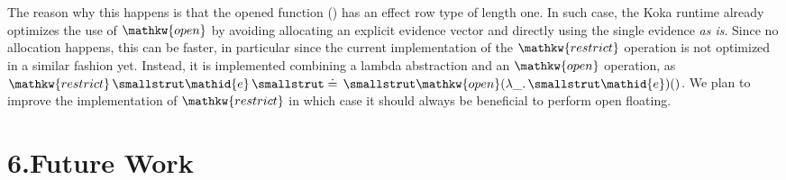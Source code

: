 \documentclass{llncs}
\begin{document}
The reason why this happens is that the 
opened function () has an effect row type of length one.
In such case, the Koka runtime already optimizes the use of $\mathpre{\mathkw{open}}$
by avoiding allocating an explicit evidence vector and directly using
the single evidence \emph{as is}. Since no allocation happens, this can
be faster, in particular since the current implementation of the $\mathpre{\mathkw{restrict}}$ operation is not optimized in a similar fashion yet.
Instead, it is implemented combining a lambda abstraction and an $\mathpre{\mathkw{open}}$ operation, as
$\mathpre{\mathkw{restrict}~\mathid{e}~\doteq{}~\mathkw{open}(\lambda\_.~\mathid{e})()}$.
We plan to improve the implementation of $\mathpre{\mathkw{restrict}}$ in which case
it should always be beneficial to perform open floating.%


\section{6.\hspace*{0.5em}Future Work}%
\end{document}
